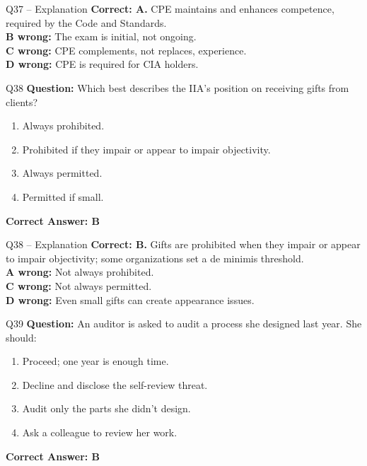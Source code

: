 \documentclass[aspectratio=169,10pt]{beamer}
\begin{document}
	\begin{frame}[t]{Q37 -- Explanation}
		\small
		\textbf{Correct: A.} CPE maintains and enhances competence, required by the Code and Standards. \\[4pt]
		\textbf{B wrong:} The exam is initial, not ongoing. \\[2pt]
		\textbf{C wrong:} CPE complements, not replaces, experience. \\[2pt]
		\textbf{D wrong:} CPE is required for CIA holders.
	\end{frame}
	
	\begin{frame}[t]{Q38}
		\small
		\textbf{Question:} Which best describes the IIA's position on receiving gifts from clients?
		\begin{enumerate}[label=\Alph*.,itemsep=1pt,topsep=2pt]
			\item Always prohibited.
			\item Prohibited if they impair or appear to impair objectivity.
			\item Always permitted.
			\item Permitted if small.
		\end{enumerate}
		\vspace{4pt}
		\textbf{Correct Answer: B}
	\end{frame}
	
	\begin{frame}[t]{Q38 -- Explanation}
		\small
		\textbf{Correct: B.} Gifts are prohibited when they impair or appear to impair objectivity; some organizations set a de minimis threshold. \\[4pt]
		\textbf{A wrong:} Not always prohibited. \\[2pt]
		\textbf{C wrong:} Not always permitted. \\[2pt]
		\textbf{D wrong:} Even small gifts can create appearance issues.
	\end{frame}
	
	\begin{frame}[t]{Q39}
		\small
		\textbf{Question:} An auditor is asked to audit a process she designed last year. She should:
		\begin{enumerate}[label=\Alph*.,itemsep=1pt,topsep=2pt]
			\item Proceed; one year is enough time.
			\item Decline and disclose the self-review threat.
			\item Audit only the parts she didn't design.
			\item Ask a colleague to review her work.
		\end{enumerate}
		\vspace{4pt}
		\textbf{Correct Answer: B}
	\end{frame}
	
\end{document}
